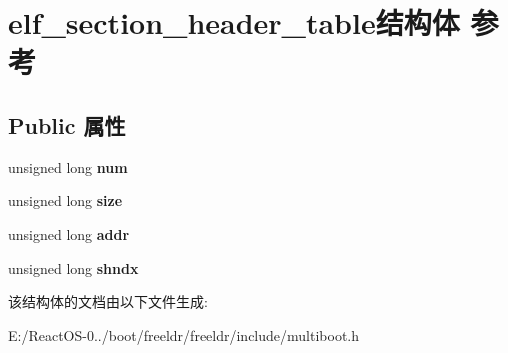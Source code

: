 \hypertarget{structelf__section__header__table}{}\section{elf\+\_\+section\+\_\+header\+\_\+table结构体 参考}
\label{structelf__section__header__table}
\subsection*{Public 属性}
\begin{DoxyCompactItemize}
\item 
\mbox{\label{structelf__section__header__table_a9930f5d42f50261477e32c494c0a8ede}} 
unsigned long {\bfseries num}
\item 
\mbox{\label{structelf__section__header__table_a2b95483fa97636019b8080792c6968b7}} 
unsigned long {\bfseries size}
\item 
\mbox{\label{structelf__section__header__table_a1b16844c046307dcb67e3e35482df083}} 
unsigned long {\bfseries addr}
\item 
\mbox{\label{structelf__section__header__table_a449a7a6aaebf6946c4580649451cf463}} 
unsigned long {\bfseries shndx}
\end{DoxyCompactItemize}


该结构体的文档由以下文件生成\+:\begin{DoxyCompactItemize}
\item 
E\+:/\+React\+O\+S-\/0../boot/freeldr/freeldr/include/multiboot.\+h\end{DoxyCompactItemize}
